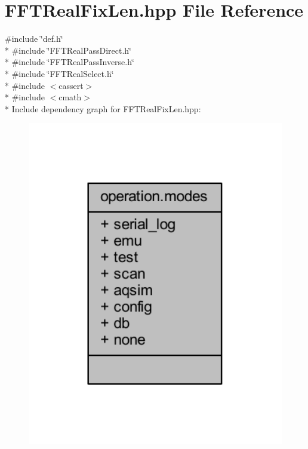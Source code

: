 \hypertarget{a00098}{\section{F\+F\+T\+Real\+Fix\+Len.\+hpp File Reference}
\label{a00098}
}
{\ttfamily \#include \char`\"{}def.\+h\char`\"{}}\\*
{\ttfamily \#include \char`\"{}F\+F\+T\+Real\+Pass\+Direct.\+h\char`\"{}}\\*
{\ttfamily \#include \char`\"{}F\+F\+T\+Real\+Pass\+Inverse.\+h\char`\"{}}\\*
{\ttfamily \#include \char`\"{}F\+F\+T\+Real\+Select.\+h\char`\"{}}\\*
{\ttfamily \#include $<$cassert$>$}\\*
{\ttfamily \#include $<$cmath$>$}\\*
Include dependency graph for F\+F\+T\+Real\+Fix\+Len.\+hpp\+:
\nopagebreak
\begin{figure}[H]
\begin{center}
\leavevmode
\includegraphics[width=350pt]{dd/dd7/a00260}
\end{center}
\end{figure}
